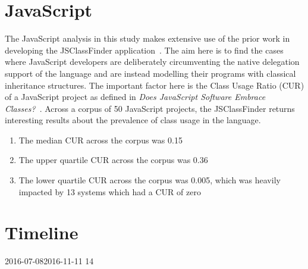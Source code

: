\section{JavaScript}
The JavaScript analysis in this study makes extensive use of the prior work in developing the JSClassFinder application~\cite{JSClassFinder}. The aim here is to find the cases where JavaScript developers are deliberately circumventing the native delegation support of the language and are instead modelling their programs with classical inheritance structures. The important factor here is the Class Usage Ratio (CUR) of a JavaScript project as defined in \textit{Does JavaScript Software Embrace Classes?~\cite{JSClassFinder}}. Across a corpus of 50 JavaScript projects, the JSClassFinder returns interesting results about the prevalence of class usage in the language.
\begin{enumerate}
	\item The median CUR across the corpus was 0.15
	\item The upper quartile CUR across the corpus was 0.36
	\item The lower quartile CUR across the corpus was 0.005, which was heavily impacted by 13 systems which had a CUR of zero
\end{enumerate}

\section{Timeline}
\begin{ganttchart}[
	hgrid,
	vgrid={*{6}{draw=none},dotted},
	x unit=0.9mm,
	group peaks tip position=0,
	group peaks height=.2,
	group peaks width=2,
	time slot format=isodate
	]{2016-07-08}{2016-11-11}
	14
	 \\
	\\
		\\
		\\
		\\
		 \\
	\\
		\\
		\\
	\\
		\\
\end{ganttchart}